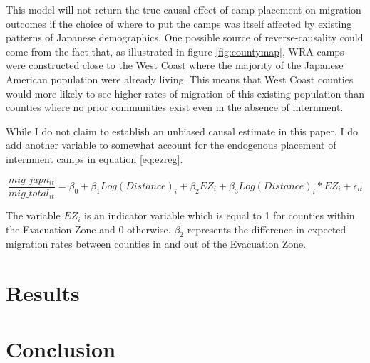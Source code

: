 \documentclass[12pt]{article}
\begin{document}
This model will not return the true causal effect of camp placement on migration outcomes if the choice of where to put the camps was itself affected by existing patterns of Japanese demographics.
One possible source of reverse-causality could come from the fact that, as illustrated in figure \ref{fig:countymap},
WRA camps were constructed close to the West Coast where the majority of the Japanese American population were already living. 
This means that West Coast counties would more likely to see higher rates of migration of this existing population than counties where no prior communities exist even in the absence of internment. 

While I do not claim to establish an unbiased causal estimate in this paper, 
I do add another variable to somewhat account for the endogenous placement of internment camps in equation \ref{eq:ezreg}.

\begin{equation}\label{eq:ezreg}
    \frac{mig\_japn_{it}}{mig\_total_{it}} = \beta_0 + \beta_1 Log(Distance)_i + \beta_2 EZ_i + \beta_3 Log(Distance)_i * EZ_i +  \epsilon_{it}
\end{equation}

The variable $EZ_i$ is an indicator variable which is equal to 1 for counties within the Evacuation Zone and 0 otherwise.
$\beta_2$ represents the difference in expected migration rates between counties in and out of the Evacuation Zone.


\section{Results}\label{results}





\section{Conclusion}\label{conclusion}



\end{document}
